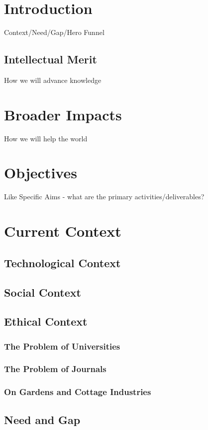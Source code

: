 \documentclass[11pt]{article}
\begin{document}
\pagestyle{empty} 
\setlength{\baselineskip}{12.6pt} 


\section{Introduction\label{sec:intro}}
Context/Need/Gap/Hero Funnel


\subsection{Intellectual Merit\label{sec:IM}}
How we will advance knowledge


\section{Broader Impacts\label{sec:BI}}
How we will help the world

\section{Objectives}
 Like Specific Aims - what are the primary activities/deliverables?

\newpage

\section{Current Context}
\subsection{Technological Context}
\subsection{Social Context}
\subsection{Ethical Context}
\subsubsection{The Problem of Universities}
\subsubsection{The Problem of Journals}
\subsubsection{On Gardens and Cottage Industries}
\subsection{Need and Gap}

\newpage
\printbibliography
\end{document}
